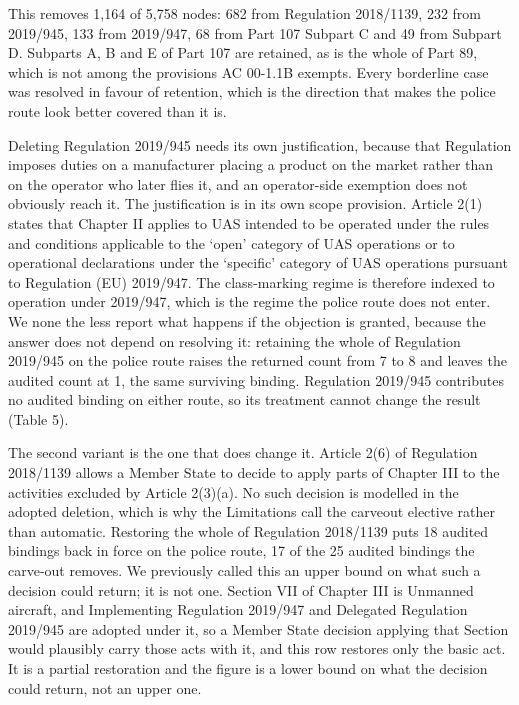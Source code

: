 This removes 1,164 of 5,758 nodes: 682 from Regulation 2018/1139, 232 from 2019/945, 133 from 2019/947, 68 from Part 107 Subpart C and 49 from Subpart D. Subparts A, B and E of Part 107 are retained, as is the whole of Part 89, which is not among the provisions AC 00-1.1B exempts. Every borderline case was resolved in favour of retention, which is the direction that makes the police route look better covered than it is.

Deleting Regulation 2019/945 needs its own justification, because that Regulation imposes duties on a manufacturer placing a product on the market rather than on the operator who later flies it, and an operator-side exemption does not obviously reach it. The justification is in its own scope provision. Article 2(1) states that Chapter II applies to UAS intended to be operated under the rules and conditions applicable to the `open' category of UAS operations or to operational declarations under the `specific' category of UAS operations pursuant to Regulation (EU) 2019/947. The class-marking regime is therefore indexed to operation under 2019/947, which is the regime the police route does not enter. We none the less report what happens if the objection is granted, because the answer does not depend on resolving it: retaining the whole of Regulation 2019/945 on the police route raises the returned count from 7 to 8 and leaves the audited count at 1, the same surviving binding. Regulation 2019/945 contributes no audited binding on either route, so its treatment cannot change the result (Table 5).

The second variant is the one that does change it. Article 2(6) of Regulation 2018/1139 allows a Member State to decide to apply parts of Chapter III to the activities excluded by Article 2(3)(a). No such decision is modelled in the adopted deletion, which is why the Limitations call the carveout elective rather than automatic. Restoring the whole of Regulation 2018/1139 puts 18 audited bindings back in force on the police route, 17 of the 25 audited bindings the carve-out removes. We previously called this an upper bound on what such a decision could return; it is not one. Section VII of Chapter III is Unmanned aircraft, and Implementing Regulation 2019/947 and Delegated Regulation 2019/945 are adopted under it, so a Member State decision applying that Section would plausibly carry those acts with it, and this row restores only the basic act. It is a partial restoration and the figure is a lower bound on what the decision could return, not an upper one.

